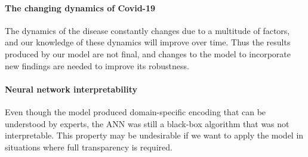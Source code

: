 \paragraph{The changing dynamics of Covid-19}
The dynamics of the disease constantly changes due to a multitude of factors, and our knowledge of these dynamics will improve over time.
Thus the results produced by our model are not final, and changes to the model to incorporate new findings are needed to improve its robustness.

\paragraph{Neural network interpretability}
Even though the model produced domain-specific encoding that can be understood by experts, the \gls{ANN} was still a black-box algorithm that was not interpretable.
This property may be undesirable if we want to apply the model in situations where full transparency is required.
